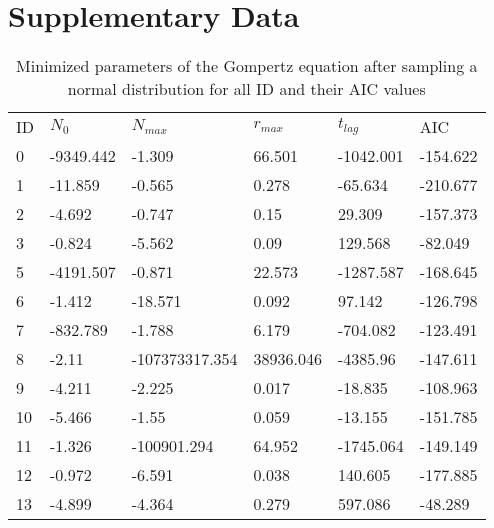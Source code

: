 \documentclass[11pt]{article}
\begin{document}

\nolinenumbers

\pagebreak
\section{Supplementary Data}

    \begin{center}
    \begin{longtable}{llllll}
        \caption{Minimized parameters of the Gompertz equation after sampling a normal distribution for all ID and their AIC values}
        \label{table:3}\\
        ID  & $N_{0}$       & $N_{max}$                 & $r_{max}$            & $t_{lag}$      & AIC      \\
        0   & -9349.442  & -1.309                 & 66.501            & -1042.001          & -154.622 \\
        1   & -11.859    & -0.565                 & 0.278             & -65.634            & -210.677 \\
        2   & -4.692     & -0.747                 & 0.15              & 29.309             & -157.373 \\
        3   & -0.824     & -5.562                 & 0.09              & 129.568            & -82.049  \\
        5   & -4191.507  & -0.871                 & 22.573            & -1287.587          & -168.645 \\
        6   & -1.412     & -18.571                & 0.092             & 97.142             & -126.798 \\
        7   & -832.789   & -1.788                 & 6.179             & -704.082           & -123.491 \\
        8   & -2.11      & -107373317.354         & 38936.046         & -4385.96           & -147.611 \\
        9   & -4.211     & -2.225                 & 0.017             & -18.835            & -108.963 \\
        10  & -5.466     & -1.55                  & 0.059             & -13.155            & -151.785 \\
        11  & -1.326     & -100901.294            & 64.952            & -1745.064          & -149.149 \\
        12  & -0.972     & -6.591                 & 0.038             & 140.605            & -177.885 \\
        13  & -4.899     & -4.364                 & 0.279             & 597.086            & -48.289  \\

\end{longtable}
\end{center}
\end{document}
